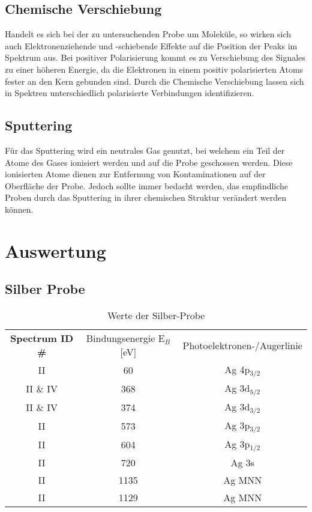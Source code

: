 \documentclass{article}
\begin{document}
\subsection{Chemische Verschiebung}

Handelt es sich bei der zu untersuchenden Probe um Moleküle, so wirken sich
auch Elektronenziehende und -schiebende Effekte auf die Position der Peaks im
Spektrum aus. Bei positiver Polarisierung kommt es zu Verschiebung des Signales
zu einer höheren Energie, da die Elektronen in einem positiv polarisierten
Atoms fester an den Kern gebunden sind. Durch die Chemische Verschiebung lassen
sich in Spektren unterschiedlich polarisierte Verbindungen identifizieren.

\subsection{Sputtering}

Für das Sputtering wird ein neutrales Gas genutzt, bei welchem ein Teil der
Atome des Gases ionisiert werden und auf die Probe geschossen werden. Diese
ionisierten Atome dienen zur Entfernung von Kontaminationen auf der Oberfläche
der Probe. Jedoch sollte immer bedacht werden, das empfindliche Proben durch
das Sputtering in ihrer chemischen Struktur verändert werden können. 





\section{Auswertung}


\subsection{Silber Probe}

\begin{table}[htpb]
  \begin{tabular}{ccc}
    \textbf{Spectrum ID \#} & Bindungsenergie E$_B$ [eV] & Photoelektronen-/Augerlinie \\
    II & 60 & Ag 4p$_{3/2}$  \\
    II \& IV  &368 & Ag 3d$_{5/2}$  \\
    II \& IV &374 & Ag 3d$_{3/2}$ \\
    II  &573 & Ag 3p$_{3/2}$ \\
    II  &604 & Ag 3p$_{1/2}$ \\
    II  &720 & Ag 3s    \\
    II  &1135 & Ag MNN  \\
    II  &1129 & Ag MNN  \\
  \end{tabular}
  \caption{Werte der Silber-Probe}
\end{table}
\end{document}

